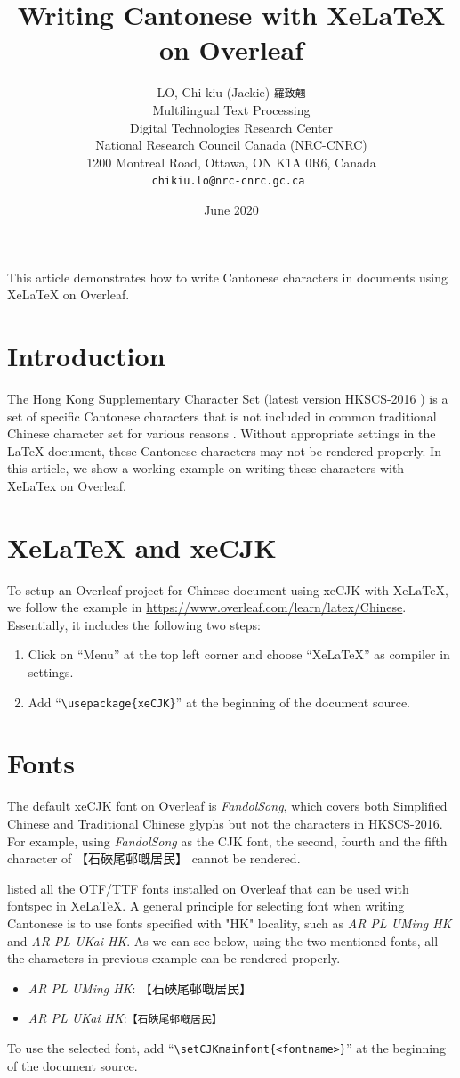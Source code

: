\documentclass[11pt,a4paper]{article}
\title{Writing Cantonese with XeLaTeX on Overleaf}
\author{LO, Chi-kiu (Jackie) {\tt 羅致翹}\\ Multilingual Text Processing \\ Digital Technologies Research Center \\National Research Council Canada (NRC-CNRC) \\ 1200 Montreal Road, Ottawa, ON K1A 0R6, Canada\\ {\tt chikiu.lo@nrc-cnrc.gc.ca } }
\date{June 2020}
\begin{document}
\maketitle
This article demonstrates how to write Cantonese characters in documents using XeLaTeX on Overleaf.

\section{Introduction}
The Hong Kong Supplementary Character Set (latest version HKSCS-2016 \citep{HKSCS2016}) is a set of specific Cantonese characters that is not included in common traditional Chinese character set for various reasons \citep{LuCheungXiongYuXu2014}. Without appropriate settings in the LaTeX document, these Cantonese characters may not be rendered properly. In this article, we show a working example on writing these characters with XeLaTex on Overleaf. 

\section{XeLaTeX and xeCJK}
To setup an Overleaf project for Chinese document using xeCJK with XeLaTeX, we follow the example in \url{https://www.overleaf.com/learn/latex/Chinese}. Essentially, it includes the following two steps:
\begin{enumerate}
\item Click on ``Menu'' at the top left corner and choose ``XeLaTeX'' as compiler in settings.
\item Add ``{\tt \textbackslash usepackage\{xeCJK\}}'' at the beginning of the document source.
\end{enumerate}

\section{Fonts}
The default xeCJK font on Overleaf is \emph{FandolSong}, which covers both Simplified Chinese and Traditional Chinese glyphs but not the characters in HKSCS-2016. For example, using \emph{FandolSong} as the CJK font, the second, fourth and the fifth character of 【石硤尾邨嘅居民】 cannot be rendered.

\citet{Lim2020} listed all the OTF/TTF fonts installed on Overleaf that can be used with fontspec in XeLaTeX. A general principle for selecting font when writing Cantonese is to use fonts specified with "HK" locality, such as \emph{AR PL UMing HK} and \emph{AR PL UKai HK}. As we can see below, using the two mentioned fonts, all the characters in previous example can be rendered properly. 

\begin{itemize}
    \item[] \emph{AR PL UMing HK}: {\sf【石硤尾邨嘅居民】} 
    \item[] \emph{AR PL UKai HK}:{\tt【石硤尾邨嘅居民】} 
\end{itemize}

To use the selected font, add ``{\tt \textbackslash setCJKmainfont\{<fontname>\}}'' at the beginning of the document source.



\end{document}
